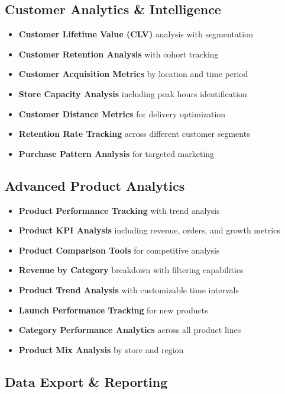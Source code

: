 \documentclass[11pt,a4paper]{article}
\begin{document}
\subsection{Customer Analytics \& Intelligence}

\begin{itemize}[leftmargin=*]
    \item \textbf{Customer Lifetime Value (CLV)} analysis with segmentation
    \item \textbf{Customer Retention Analysis} with cohort tracking
    \item \textbf{Customer Acquisition Metrics} by location and time period
    \item \textbf{Store Capacity Analysis} including peak hours identification
    \item \textbf{Customer Distance Metrics} for delivery optimization
    \item \textbf{Retention Rate Tracking} across different customer segments
    \item \textbf{Purchase Pattern Analysis} for targeted marketing
\end{itemize}

\subsection{Advanced Product Analytics}

\begin{itemize}[leftmargin=*]
    \item \textbf{Product Performance Tracking} with trend analysis
    \item \textbf{Product KPI Analysis} including revenue, orders, and growth metrics
    \item \textbf{Product Comparison Tools} for competitive analysis
    \item \textbf{Revenue by Category} breakdown with filtering capabilities
    \item \textbf{Product Trend Analysis} with customizable time intervals
    \item \textbf{Launch Performance Tracking} for new products
    \item \textbf{Category Performance Analytics} across all product lines
    \item \textbf{Product Mix Analysis} by store and region
\end{itemize}

\subsection{Data Export \& Reporting}
\end{document}
